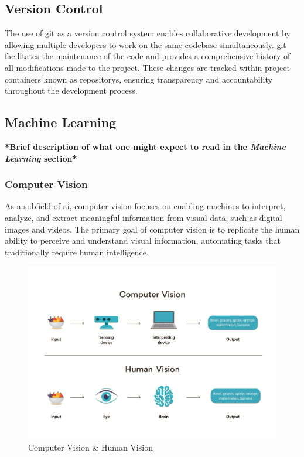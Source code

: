 \subsection{Version Control}
\label{subsec:version-control}

The use of \gls{git} as a version control system enables collaborative development by allowing multiple developers to work on the same codebase simultaneously. \gls{git} facilitates the maintenance of the code and provides a comprehensive history of all modifications made to the project. These changes are tracked within project containers known as \glspl{repository}, ensuring transparency and accountability throughout the development process. \cite{alphaefficiency:git}

\subsection{Machine Learning}
\label{sec:machine-learning}

\textbf{*Brief description of what one might expect to read in the \textit{Machine Learning} section*}

\subsubsection*{Computer Vision}
\label{subsubsec:computer-vision}

As a subfield of \gls{ai}, computer vision focuses on enabling machines to interpret, analyze, and extract meaningful information from visual data, such as digital images and videos. The primary goal of computer vision is to replicate the human ability to perceive and understand visual information, automating tasks that traditionally require human intelligence. \cite{google:vision, microsoft:vision}

\begin{figure}[h!]
    \centering
    \includegraphics[width=0.75\linewidth]{figures//theory/computer-vision.png}
    \caption{Computer Vision \& Human Vision \cite{turing:computer-vision}}
    \label{fig:computer-vision}
\end{figure}

